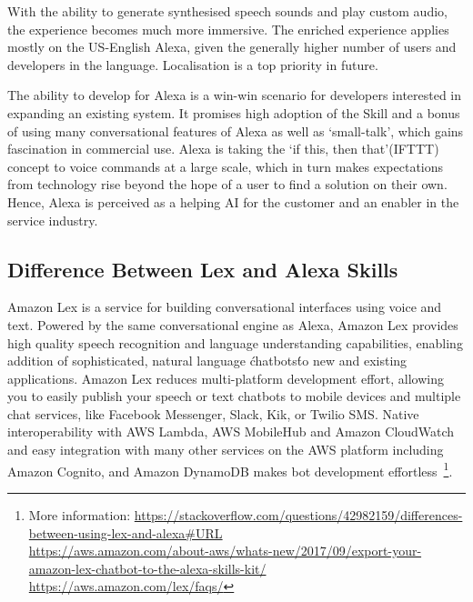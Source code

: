 With the ability to generate synthesised speech sounds and play custom audio, the experience becomes much more immersive.
The enriched experience applies mostly on the US-English Alexa, given the generally higher number of users and developers in the language. Localisation is a top priority in future.




The ability to develop for Alexa is a win-win scenario for developers interested in expanding an existing system. It promises high adoption of the Skill and a %
bonus of using many conversational features of Alexa as well as `small-talk', which gains fascination in commercial use.
Alexa is taking the `if this, then that'(IFTTT) concept  to voice commands at a large scale, which in turn makes expectations from technology rise beyond the hope of a user to find a solution on their own. Hence, Alexa is perceived as a helping AI for the customer and an enabler in the service industry.





\subsection*{Difference Between Lex and Alexa Skills}
\label{lexAlexa}  

Amazon Lex is a service for building conversational interfaces using voice and text. Powered by the same conversational engine as Alexa, Amazon Lex provides high quality speech recognition and language understanding capabilities, enabling addition of sophisticated, natural language \'chatbots\' to new and existing applications. Amazon Lex reduces multi-platform development effort, allowing you to easily publish your speech or text chatbots to mobile devices and multiple chat services, like Facebook Messenger, Slack, Kik, or Twilio SMS. Native interoperability with AWS Lambda, AWS MobileHub and Amazon CloudWatch and easy integration with many other services on the AWS platform including Amazon Cognito, and Amazon DynamoDB makes bot development effortless~\footnote{
	More information: \url{https://stackoverflow.com/questions/42982159/differences-between-using-lex-and-alexa\#URL}\\
	\url{https://aws.amazon.com/about-aws/whats-new/2017/09/export-your-amazon-lex-chatbot-to-the-alexa-skills-kit/}\\
	\url{https://aws.amazon.com/lex/faqs/}
}.





